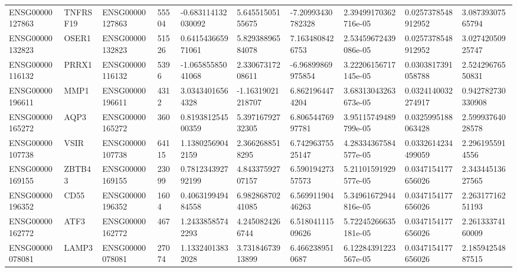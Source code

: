 \begin{tabular}{@{}llllllllll@{}}
ENSG00000127863 & TNFRSF19 & ENSG00000127863 & 55504 & -0.683114132030092 & 5.64551505155675 & -7.20993430782328 & 2.39499170362716e-05 & 0.0257378548912952 & 3.08739307565794 \\
ENSG00000132823 & OSER1 & ENSG00000132823 & 51526 & 0.641543665971061 & 5.82938896584078 & 7.1634808426753 & 2.53459672439086e-05 & 0.0257378548912952 & 3.02742050925747 \\
ENSG00000116132 & PRRX1 & ENSG00000116132 & 5396 & -1.06585585041068 & 2.33067317208611 & -6.96899869975854 & 3.22206156717145e-05 & 0.0303817391058788 & 2.52429676550831 \\
ENSG00000196611 & MMP1 & ENSG00000196611 & 4312 & 3.03434016564328 & -1.16319021218707 & 6.8621964474204 & 3.68313043263673e-05 & 0.0324140032274917 & 0.942782730330908 \\
ENSG00000165272 & AQP3 & ENSG00000165272 & 360 & 0.819381254500359 & 5.39716792732305 & 6.80654476997781 & 3.95115749489799e-05 & 0.0325995188063428 & 2.59993764028578 \\
ENSG00000107738 & VSIR & ENSG00000107738 & 64115 & 1.13802569042159 & 2.3662688518295 & 6.74296375525147 & 4.28334367584577e-05 & 0.0332614234499059 & 2.2961955914556 \\
ENSG00000169155 & ZBTB43 & ENSG00000169155 & 23099 & 0.781234392792199 & 4.84337592707157 & 6.59019427357573 & 5.21101591929577e-05 & 0.0347154177656026 & 2.34344513627565 \\
ENSG00000196352 & CD55 & ENSG00000196352 & 1604 & 0.406319949484558 & 6.98286870241085 & 6.56991190446263 & 5.34961672944816e-05 & 0.0347154177656026 & 2.26317716251193 \\
ENSG00000162772 & ATF3 & ENSG00000162772 & 467 & 1.24338585742293 & 4.2450824266744 & 6.51804111509626 & 5.72245266635181e-05 & 0.0347154177656026 & 2.26133374160009 \\
ENSG00000078081 & LAMP3 & ENSG00000078081 & 27074 & 1.13324013832028 & 3.73184673913899 & 6.4662389510687 & 6.12284391223567e-05 & 0.0347154177656026 & 2.18594254887515 \\
\bottomrule
\end{tabular}
\endgroup
